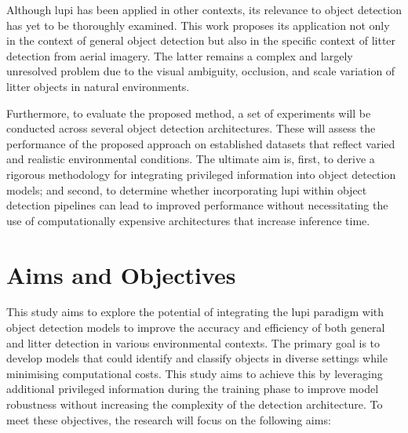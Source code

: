Although \gls{lupi} has been applied in other contexts, its relevance to object detection has yet to be thoroughly examined. This work proposes its application not only in the context of general object detection but also in the specific context of litter detection from aerial imagery. The latter remains a complex and largely unresolved problem due to the visual ambiguity, occlusion, and scale variation of litter objects in natural environments.

Furthermore, to evaluate the proposed method, a set of experiments will be conducted across several object detection architectures. These will assess the performance of the proposed approach on established datasets that reflect varied and realistic environmental conditions. The ultimate aim is, first, to derive a rigorous methodology for integrating privileged information into object detection models; and second, to determine whether incorporating \gls{lupi} within object detection pipelines can lead to improved performance without necessitating the use of computationally expensive architectures that increase inference time.

\section{Aims and Objectives}
\label{sec:aims}

This study aims to explore the potential of integrating the \gls{lupi} paradigm with object detection models to improve the accuracy and efficiency of both general and litter detection in various environmental contexts. The primary goal is to develop models that could identify and classify objects in diverse settings while minimising computational costs. This study aims to achieve this by leveraging additional privileged information during the training phase to improve model robustness without increasing the complexity of the detection architecture. To meet these objectives, the research will focus on the following aims:

